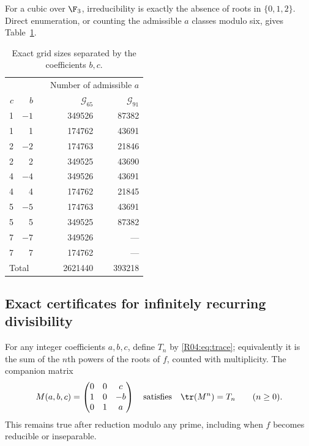 \documentclass[11pt,a4paper]{article}
\theoremstyle{definition}\newtheorem{definition}[theorem]{Definition}
\theoremstyle{remark}\newtheorem{remark}[theorem]{Remark}
\begin{document}
For a cubic over $\F_3$, irreducibility is exactly the absence of
roots in $\{0,1,2\}$. Direct enumeration, or counting the admissible
$a$ classes modulo six, gives Table~\ref{R04:tab:counts}.
\begin{table}[htbp]
\centering
\caption{Exact grid sizes separated by the coefficients $b,c$.}
\label{R04:tab:counts}
\begin{tabular}{rrr@{\qquad}rr}
\toprule
&&&\multicolumn{2}{c}{Number of admissible $a$}\\
$c$&$b$&&$\mathcal G_{65}$&$\mathcal G_{91}$\\
\midrule
1&$-1$&&349526&87382\\
1&1&&174762&43691\\
2&$-2$&&174763&21846\\
2&2&&349525&43690\\
4&$-4$&&349526&43691\\
4&4&&174762&21845\\
5&$-5$&&174763&43691\\
5&5&&349525&87382\\
7&$-7$&&349526&---\\
7&7&&174762&---\\
\midrule
\multicolumn{3}{l}{Total}&2621440&393218\\
\bottomrule
\end{tabular}
\end{table}

\subsection{Exact certificates for infinitely recurring divisibility}
\label{R04:sec:certificates}

For any integer coefficients $a,b,c$, define $T_n$ by
\eqref{R04:eq:trace}; equivalently it is the sum of the $n$th powers of
the roots of $f$, counted with multiplicity. The companion matrix
\begin{equation}\label{R04:eq:matrix}
 M(a,b,c)=\begin{pmatrix}0&0&c\\1&0&-b\\0&1&a\end{pmatrix}
 \quad\text{satisfies}\quad \tr(M^n)=T_n\qquad(n\ge0).
\end{equation}
This remains true after reduction modulo any prime, including when
$f$ becomes reducible or inseparable.
\end{document}
